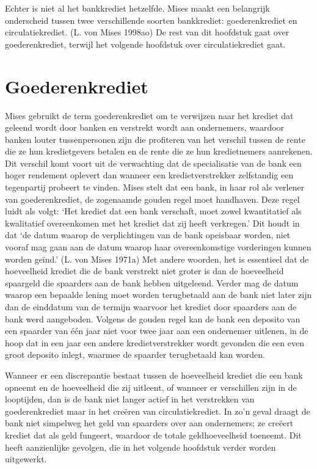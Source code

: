 \documentclass[
  a5paper,
  smalldemyvopaper,11pt,twoside,onecolumn,openright,extrafontsizes,
hidelinks]{memoir}
\begin{document}
Echter is niet al het bankkrediet hetzelfde. Mises maakt een belangrijk
onderscheid tussen twee verschillende soorten bankkrediet:
goederenkrediet en circulatiekrediet. (L. von Mises 1998ao) De rest van
dit hoofdstuk gaat over goederenkrediet, terwijl het volgende hoofdstuk
over circulatiekrediet gaat.

\section{Goederenkrediet}\label{goederenkrediet}

Mises gebruikt de term goederenkrediet om te verwijzen naar het krediet
dat geleend wordt door banken en verstrekt wordt aan ondernemers,
waardoor banken louter tussenpersonen zijn die profiteren van het
verschil tussen de rente die ze hun kredietgevers betalen en de rente
die ze hun kredietnemers aanrekenen. Dit verschil komt voort uit de
verwachting dat de specialisatie van de bank een hoger rendement
oplevert dan wanneer een kredietverstrekker zelfstandig een tegenpartij
probeert te vinden. Mises stelt dat een bank, in haar rol als verlener
van goederenkrediet, de zogenaamde gouden regel moet handhaven. Deze
regel luidt als volgt: `Het krediet dat een bank verschaft, moet zowel
kwantitatief als kwalitatief overeenkomen met het krediet dat zij heeft
verkregen.' Dit houdt in dat `de datum waarop de verplichtingen van de
bank opeisbaar worden, niet vooraf mag gaan aan de datum waarop haar
overeenkomstige vorderingen kunnen worden geïnd.' (L. von Mises 1971a)
Met andere woorden, het is essentieel dat de hoeveelheid krediet die de
bank verstrekt niet groter is dan de hoeveelheid spaargeld die spaarders
aan de bank hebben uitgeleend. Verder mag de datum waarop een bepaalde
lening moet worden terugbetaald aan de bank niet later zijn dan de
einddatum van de termijn waarvoor het krediet door spaarders aan de bank
werd aangeboden. Volgens de gouden regel kan de bank een deposito van
een spaarder van één jaar niet voor twee jaar aan een ondernemer
uitlenen, in de hoop dat in een jaar een andere kredietverstrekker wordt
gevonden die een even groot deposito inlegt, waarmee de spaarder
terugbetaald kan worden.

Wanneer er een discrepantie bestaat tussen de hoeveelheid krediet die
een bank opneemt en de hoeveelheid die zij uitleent, of wanneer er
verschillen zijn in de looptijden, dan is de bank niet langer actief in
het verstrekken van goederenkrediet maar in het creëren van
circulatiekrediet. In zo'n geval draagt de bank niet simpelweg het geld
van spaarders over aan ondernemers; ze creëert krediet dat als geld
fungeert, waardoor de totale geldhoeveelheid toeneemt. Dit heeft
aanzienlijke gevolgen, die in het volgende hoofdstuk verder worden
uitgewerkt.
\end{document}
